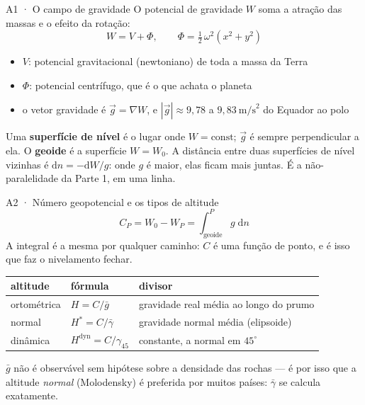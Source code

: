 \documentclass[aspectratio=169,11pt]{beamer}
\begin{document}
\begin{frame}{A1 · O campo de gravidade}
  \small
  O potencial de gravidade $W$ soma a atração das massas e o efeito da rotação:
  \[ W = V + \Phi, \qquad \Phi = \tfrac{1}{2}\,\omega^2 (x^2 + y^2) \]
  \begin{itemize}
    \item $V$: potencial gravitacional (newtoniano) de toda a massa da Terra
    \item $\Phi$: potencial centrífugo, que é o que achata o planeta
    \item o vetor gravidade é $\vec{g} = \nabla W$, e $|\vec g| \approx 9{,}78$ a
          $9{,}83\ \text{m/s}^2$ do Equador ao polo
  \end{itemize}
  \medskip
  Uma \textbf{superfície de nível} é o lugar onde $W = \text{const}$; $\vec g$ é sempre
  perpendicular a ela. O \textbf{geoide} é a superfície $W = W_0$.
  \medskip
  A distância entre duas superfícies de nível vizinhas é $\mathrm{d}n = -\mathrm{d}W / g$:
  onde $g$ é maior, elas ficam mais juntas. É a não-paralelidade da Parte 1, em uma linha.
\end{frame}

\begin{frame}{A2 · Número geopotencial e os tipos de altitude}
  \small
  \[ C_P = W_0 - W_P = \int_{\text{geoide}}^{P} g \; \mathrm{d}n \]
  A integral é a mesma por qualquer caminho: $C$ é uma função de ponto, e é isso que faz o
  nivelamento fechar.
  \medskip
  \centering
  \renewcommand{\arraystretch}{1.6}
  \begin{tabular}{lll}
    \toprule
    altitude & fórmula & divisor \\
    \midrule
    ortométrica & $H = C / \bar{g}$ & gravidade real média ao longo do prumo \\
    normal & $H^{*} = C / \bar{\gamma}$ & gravidade normal média (elipsoide) \\
    dinâmica & $H^{\mathrm{dyn}} = C / \gamma_{45}$ & constante, a normal em $45^{\circ}$ \\
    \bottomrule
  \end{tabular}
  \flushleft
  \medskip
  $\bar g$ não é observável sem hipótese sobre a densidade das rochas --- é por isso que a
  altitude \emph{normal} (Molodensky) é preferida por muitos países: $\bar\gamma$ se
  calcula exatamente.
\end{frame}
\end{document}
